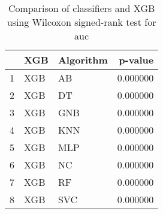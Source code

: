 \begin{table}
\footnotesize
\caption{Comparison of classifiers and XGB using Wilcoxon signed-rank test for auc}
\label{tab:XGB wilcoxon AUC comparison}
\begin{tabular}{lllr}
\hline
 & XGB & Algorithm & p-value \\
\hline
1 & XGB & AB & 0.000000 \\
2 & XGB & DT & 0.000000 \\
3 & XGB & GNB & 0.000000 \\
4 & XGB & KNN & 0.000000 \\
5 & XGB & MLP & 0.000000 \\
6 & XGB & NC & 0.000000 \\
7 & XGB & RF & 0.000000 \\
8 & XGB & SVC & 0.000000 \\
\hline
\end{tabular}
\end{table}
